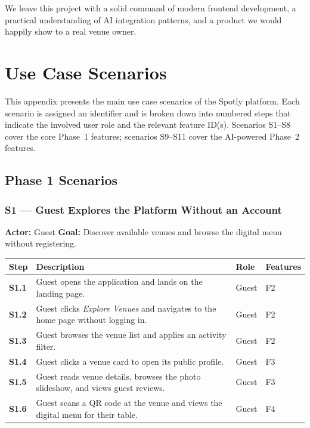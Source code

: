 \documentclass[12pt,a4paper,oneside]{report}
\begin{document}
We leave this project with a solid command of modern frontend development,
a practical understanding of AI integration patterns, and a product we
would happily show to a real venue owner.


\appendix

\chapter{Use Case Scenarios}

This appendix presents the main use case scenarios of the Spotly platform.
Each scenario is assigned an identifier and is broken down into numbered steps
that indicate the involved user role and the relevant feature ID(s).
Scenarios S1--S8 cover the core Phase~1 features; scenarios S9--S11 cover
the AI-powered Phase~2 features.

\section*{Phase 1 Scenarios}

\subsection*{S1 --- Guest Explores the Platform Without an Account}
\begin{mdframed}[style=scenariobox]
\textbf{Actor:} Guest \quad
\textbf{Goal:} Discover available venues and browse the digital menu
without registering.
\end{mdframed}

\begin{longtable}{>{\bfseries}l L{6.2cm} l L{2.8cm}}
  \toprule
  Step & Description & Role & Features \\
  \midrule
  S1.1 & Guest opens the application and lands on the landing page. & Guest & F2 \\
  S1.2 & Guest clicks \emph{Explore Venues} and navigates to the home page
         without logging in. & Guest & F2 \\
  S1.3 & Guest browses the venue list and applies an activity filter. & Guest & F2 \\
  S1.4 & Guest clicks a venue card to open its public profile. & Guest & F3 \\
  S1.5 & Guest reads venue details, browses the photo slideshow, and views
         guest reviews. & Guest & F3 \\
  S1.6 & Guest scans a QR code at the venue and views the digital menu
         for their table. & Guest & F4 \\
  \bottomrule
\end{longtable}
\end{document}
